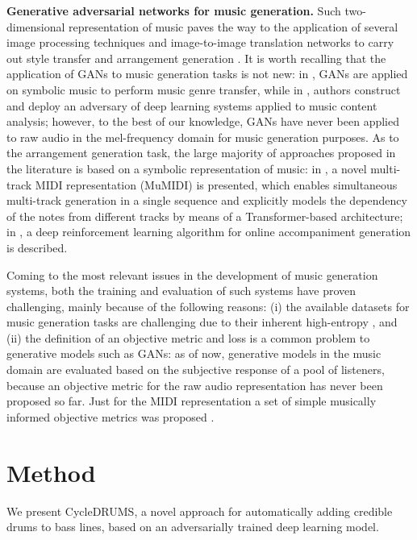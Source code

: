\documentclass[journal]{IEEEtran}
\begin{document}
\textbf{Generative adversarial networks for music generation.} Such two-dimensional representation of music paves the way to the application of several image processing techniques and image-to-image translation networks to carry out style transfer and arrangement generation \cite{isola2017image,zhu2017unpaired}. It is worth recalling that the application of GANs to music generation tasks is not new: in \cite{brunner2018symbolic}, GANs are applied on symbolic music to perform music genre transfer, while in \cite{7254179, nistal2020drumgan}, authors construct and deploy an adversary of deep learning systems applied to music content analysis; however, to the best of our knowledge, GANs have never been applied to raw audio in the mel-frequency domain for music generation purposes. As to the arrangement generation task, the large majority of approaches proposed in the literature is based on a symbolic representation of music: in \cite{ren2020popmag}, a novel multi-track MIDI representation (MuMIDI) is presented, which enables simultaneous multi-track generation in a single sequence and explicitly models the dependency of the notes from different tracks by means of a Transformer-based architecture; in \cite{jiang2020rl}, a deep reinforcement learning algorithm for online accompaniment generation is described. 

Coming to the most relevant issues in the development of music generation systems, both the training and evaluation of such systems have proven challenging, mainly because of the following reasons: (i) the available datasets for music generation tasks are challenging due to their inherent high-entropy \cite{dieleman2018challenge}, and (ii) the definition of an objective metric and loss is a common problem to generative models such as GANs: as of now, generative models in the music domain are evaluated based on the subjective response of a pool of listeners, because an objective metric for the raw audio representation has never been proposed so far. Just for the MIDI representation a set of simple musically informed objective metrics was proposed \cite{yang2020evaluation}.

\section{Method}

We present CycleDRUMS, a novel approach for automatically adding credible drums to bass lines, based on an adversarially trained deep learning model.
\end{document}
